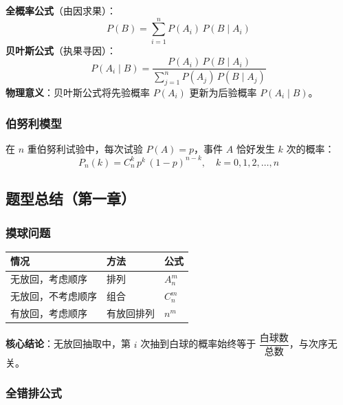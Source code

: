 \documentclass[12pt, a4paper]{article}
\begin{document}
\begin{tcolorbox}[thmbox, title={全概率公式与贝叶斯公式 —— 最高频考点}]
    \textbf{全概率公式}（由因求果）：
    \[
        P(B) = \sum_{i=1}^n P(A_i)\,P(B\mid A_i)
    \]
    \textbf{贝叶斯公式}（执果寻因）：
    \[
        P(A_i\mid B) = \frac{P(A_i)\,P(B\mid A_i)}{\displaystyle\sum_{j=1}^n P(A_j)\,P(B\mid A_j)}
    \]
    \textbf{物理意义}：贝叶斯公式将先验概率 $P(A_i)$ 更新为后验概率 $P(A_i\mid B)$。
\end{tcolorbox}

\subsubsection{伯努利模型}

\begin{tcolorbox}[thmbox, title={$n$ 重伯努利试验}]
    在 $n$ 重伯努利试验中，每次试验 $P(A)=p$，事件 $A$ 恰好发生 $k$ 次的概率：
    \[
        P_n(k) = C_n^k\,p^k\,(1-p)^{n-k}, \quad k=0,1,2,\ldots,n
    \]
\end{tcolorbox}

\subsection{题型总结（第一章）}

\subsubsection{摸球问题}

\begin{center}
    \begin{tabular}{lll}
        \toprule
        情况        & 方法    & 公式      \\
        \midrule
        无放回，考虑顺序  & 排列    & $A_n^m$ \\
        无放回，不考虑顺序 & 组合    & $C_n^m$ \\
        有放回，考虑顺序  & 有放回排列 & $n^m$   \\
        \bottomrule
    \end{tabular}
\end{center}

\textbf{核心结论}：无放回抽取中，第 $i$ 次抽到白球的概率始终等于 $\dfrac{\text{白球数}}{\text{总数}}$，与次序无关。

\subsubsection{全错排公式}
\end{document}
